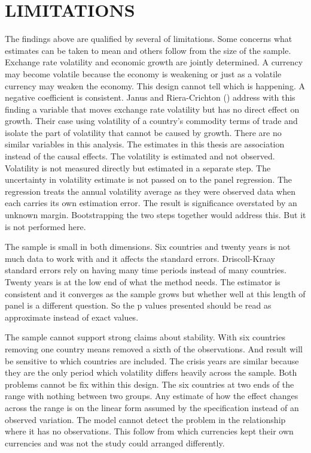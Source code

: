 \section{LIMITATIONS}\label{limitation}

The findings above are qualified by several of limitations.
Some concerns what estimates can be taken to mean and others follow from the size of the sample.
Exchange rate volatility and economic growth are jointly determined.
A currency may become volatile because the economy is weakening or just as a volatile currency may weaken the economy.
This design cannot tell which is happening.
A negative coefficient is consistent.
Janus and Riera-Crichton (\citeyear{thorsten_pdf_2015}) address with this finding a variable that moves exchange rate volatility but has no direct effect on growth.
Their case using volatility of a country's commodity terms of trade and isolate the part of volatility that cannot be caused by growth.
There are no similar variables in this analysis.
The estimates in this thesis are association instead of the causal effects.
The volatility is estimated and not observed.
Volatility is not measured directly but estimated in a separate step.
The uncertainty in volatility estimate is not passed on to the panel regression.
The regression treats the annual volatility average as they were observed data when each carries its own estimation error.
The result is significance overstated by an unknown margin.
Bootstrapping the two steps together would address this.
But it is not performed here.

\vspace{\baselineskip}

The sample is small in both dimensions.
Six countries and twenty years is not much data to work with and it affects the standard errors.
Driscoll-Kraay standard errors rely on having many time periods instead of many countries.
Twenty years is at the low end of what the method needs.
The estimator is consistent and it converges as the sample grows but whether well at this length of panel is a different question.
So the p values presented should be read as approximate instead of exact values.

\vspace{\baselineskip}

The sample cannot support strong claims about stability.
With six countries removing one country means removed a sixth of the observations.
And result will be sensitive to which countries are included.
The crisis years are similar because they are the only period which volatility differs heavily across the sample.
Both problems cannot be fix within this design.
The six countries at two ends of the range with nothing between two groups.
Any estimate of how the effect changes across the range is on the linear form assumed by the specification instead of an observed variation.
The model cannot detect the problem in the relationship where it has no observations.
This follow from which currencies kept their own currencies and was not the study could arranged differently.

